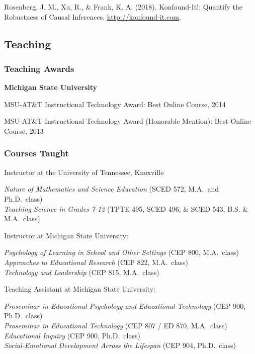 \documentclass[14,]{article}
\begin{document}
Rosenberg, J. M., Xu, R., \& Frank, K. A. (2018). Konfound-It!: Quantify
the Robustness of Causal Inferences. \url{http://konfound-it.com}.

\hypertarget{teaching}{%
\subsection{Teaching}\label{teaching}}

\hypertarget{teaching-awards}{%
\subsubsection{Teaching Awards}\label{teaching-awards}}

\textbf{Michigan State University}

MSU-AT\&T Instructional Technology Award: Best Online Course, 2014

MSU-AT\&T Instructional Technology Award (Honorable Mention): Best
Online Course, 2013

\hypertarget{courses-taught}{%
\subsubsection{Courses Taught}\label{courses-taught}}

Instructor at the University of Tennessee, Knoxville

\emph{Nature of Mathematics and Science Education} (SCED 572, M.A.~and
Ph.D.~class)\\
\emph{Teaching Science in Grades 7-12} (TPTE 495, SCED 496, \& SCED 543,
B.S. \& M.A.~class)

Instructor at Michigan State University:

\emph{Psychology of Learning in School and Other Settings} (CEP 800,
M.A.~class)\\
\emph{Approaches to Educational Research} (CEP 822, M.A.~class)\\
\emph{Technology and Leadership} (CEP 815, M.A.~class)

Teaching Assistant at Michigan State University:

\emph{Proseminar in Educational Psychology and Educational Technology}
(CEP 900, Ph.D.~class)\\
\emph{Proseminar in Educational Technology} (CEP 807 / ED 870,
M.A.~class)\\
\emph{Educational Inquiry} (CEP 900, Ph.D.~class)\\
\emph{Social-Emotional Development Across the Lifespan} (CEP 904,
Ph.D.~class)
\end{document}
